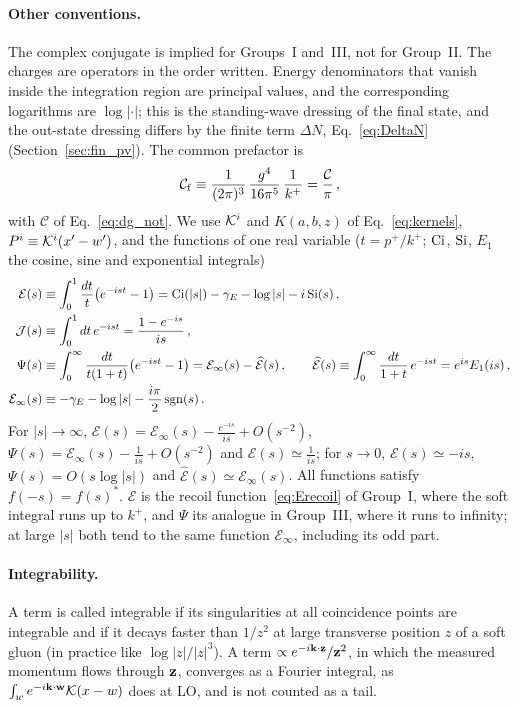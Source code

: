 \paragraph{Other conventions.} The complex conjugate is implied for Groups~I and~III, not for Group~II. The charges are operators in the order written. Energy denominators that vanish inside the integration region are principal values, and the corresponding logarithms are $\log|\cdot|$; this is the standing-wave dressing of the final state, and the out-state dressing differs by the finite term $\Delta N$, Eq.~\eqref{eq:DeltaN} (Section~\ref{sec:fin_pv}). The common prefactor is
\begin{align}\label{eq:Cf}
\mathcal C_{\rm f}\equiv\frac{1}{(2\pi)^3}\,\frac{g^4}{16\pi^5}\,\frac{1}{k^+}=\frac{\mathcal C}{\pi}\,,
\end{align}
with $\mathcal C$ of Eq.~\eqref{eq:dg_not}. We use $\mathcal{K}^i$ and $K(a,b,z)$ of Eq.~\eqref{eq:kernels}, $P^i\equiv\mathcal{K}^i(x'-w')$, and the functions of one real variable ($t=p^+/k^+$; ${\rm Ci}$, ${\rm Si}$, $E_1$ the cosine, sine and exponential integrals)
\begin{align}\label{eq:recoilfns}
\mathcal E(s)&\equiv\int_0^1\frac{dt}{t}\big(e^{-ist}-1\big)={\rm Ci}(|s|)-\gamma_E-\log|s|-i\,{\rm Si}(s)\,,\notag\\
\mathcal J(s)&\equiv\int_0^1dt\,e^{-ist}=\frac{1-e^{-is}}{is}\,,\notag\\
\Psi(s)&\equiv\int_0^\infty\frac{dt}{t(1+t)}\big(e^{-ist}-1\big)=\mathcal E_\infty(s)-\widehat{\mathcal E}(s)\,,\qquad
\widehat{\mathcal E}(s)\equiv\int_0^\infty\frac{dt}{1+t}\,e^{-ist}=e^{is}E_1(is)\,,\notag\\
\mathcal E_\infty(s)&\equiv-\gamma_E-\log|s|-\frac{i\pi}{2}\,{\rm sgn}(s)\,.
\end{align}
For $|s|\to\infty$, $\mathcal E(s)=\mathcal E_\infty(s)-\frac{e^{-is}}{is}+O(s^{-2})$, $\Psi(s)=\mathcal E_\infty(s)-\frac{1}{is}+O(s^{-2})$ and $\widehat{\mathcal E}(s)\simeq\frac{1}{is}$; for $s\to0$, $\mathcal E(s)\simeq-is$, $\Psi(s)=O(s\log|s|)$ and $\widehat{\mathcal E}(s)\simeq\mathcal E_\infty(s)$. All functions satisfy $f(-s)=f(s)^*$. $\mathcal E$ is the recoil function~\eqref{eq:Erecoil} of Group~I, where the soft integral runs up to $k^+$, and $\Psi$ its analogue in Group~III, where it runs to infinity; at large $|s|$ both tend to the same function $\mathcal E_\infty$, including its odd part.

\paragraph{Integrability.} A term is called integrable if its singularities at all coincidence points are integrable and if it decays faster than $1/z^2$ at large transverse position $z$ of a soft gluon (in practice like $\log|z|/|z|^3$). A term $\propto e^{-i\mathbf{k}\cdot\mathbf{z}}/\mathbf{z}^2$, in which the measured momentum flows through $\mathbf{z}$, converges as a Fourier integral, as $\int_we^{-i\mathbf{k}\cdot\mathbf{w}}\mathcal{K}(x-w)$ does at LO, and is not counted as a tail.

